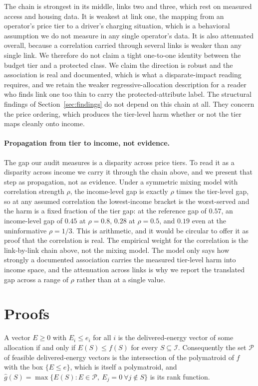 \documentclass[manuscript, screen, review, anonymous]{acmart}
\begin{document}
The chain is strongest in its middle, links two and three, which rest on measured access and housing data. It is weakest at link one, the mapping from an operator's price tier to a driver's charging situation, which is a behavioral assumption we do not measure in any single operator's data. It is also attenuated overall, because a correlation carried through several links is weaker than any single link. We therefore do not claim a tight one-to-one identity between the budget tier and a protected class. We claim the direction is robust and the association is real and documented, which is what a disparate-impact reading requires, and we retain the weaker regressive-allocation description for a reader who finds link one too thin to carry the protected-attribute label. The structural findings of Section~\ref{sec:findings} do not depend on this chain at all. They concern the price ordering, which produces the tier-level harm whether or not the tier maps cleanly onto income.

\paragraph{Propagation from tier to income, not evidence.}
The gap our audit measures is a disparity across price tiers. To read it as a disparity across income we carry it through the chain above, and we present that step as propagation, not as evidence. Under a symmetric mixing model with correlation strength $\rho$, the income-level gap is exactly $\rho$ times the tier-level gap, so at any assumed correlation the lowest-income bracket is the worst-served and the harm is a fixed fraction of the tier gap: at the reference gap of $0.57$, an income-level gap of $0.45$ at $\rho=0.8$, $0.28$ at $\rho=0.5$, and $0.19$ even at the uninformative $\rho=1/3$. This is arithmetic, and it would be circular to offer it as proof that the correlation is real. The empirical weight for the correlation is the link-by-link chain above, not the mixing model. The model only says how strongly a documented association carries the measured tier-level harm into income space, and the attenuation across links is why we report the translated gap across a range of $\rho$ rather than at a single value.

\section{Proofs}
\label{app:proofs}

\begin{lemma}\label{lem:polymatroid}
A vector $E\ge 0$ with $E_i\le e_i$ for all $i$ is the delivered-energy vector of some allocation if and only if $E(S)\le f(S)$ for every $S\subseteq\mathcal{I}$. Consequently the set $\mathcal{P}$ of feasible delivered-energy vectors is the intersection of the polymatroid of $f$ with the box $\{E\le e\}$, which is itself a polymatroid, and $\hat g(S)=\max\{E(S):E\in\mathcal{P},\ E_j=0\ \forall j\notin S\}$ is its rank function.
\end{lemma}
\end{document}
